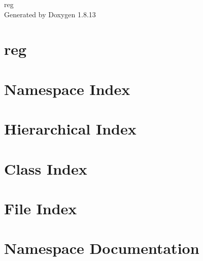 \documentclass[twoside]{book}
\newcommand{\+}{\discretionary{\mbox{\scriptsize$\hookleftarrow$}}{}{}}
\newcommand{\clearemptydoublepage}{%
  \newpage{\pagestyle{empty}\cleardoublepage}%
}
\begin{document}
\hypersetup{pageanchor=false,
             bookmarksnumbered=true,
             pdfencoding=unicode
            }
\begin{titlepage}
\vspace*{7cm}
\begin{center}%
{\Large reg }\\
\vspace*{1cm}
{\large Generated by Doxygen 1.8.13}\\
\end{center}
\end{titlepage}
\clearemptydoublepage
{}
\tableofcontents
\clearemptydoublepage
{}
\hypersetup{pageanchor=true}

\chapter{reg}
\label{md__home_adam__desktop_reg__r_e_a_d_m_e}

\chapter{Namespace Index}

\chapter{Hierarchical Index}

\chapter{Class Index}

\chapter{File Index}

\chapter{Namespace Documentation}


\end{document}
